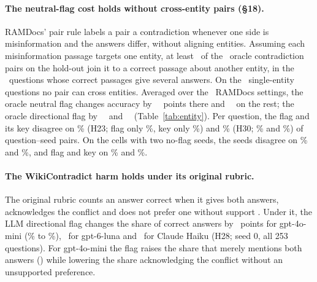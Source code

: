 \paragraph{The neutral-flag cost holds without cross-entity pairs (\S18).} RAMDocs' pair rule labels a pair a
contradiction whenever one side is misinformation and the answers differ, without aligning entities. Assuming each
misinformation passage targets one entity, at least \pairCrossLb\ of the \pairContraN\ oracle contradiction pairs on the
hold-out join it to a correct passage about another entity, in the \pairMultiN\ questions whose correct passages give
several answers. On the \pairSingleN\ single-entity questions no pair can cross entities. Averaged over the \entNeuK\
RAMDocs settings, the oracle neutral flag changes accuracy by \entNeuSingle\ \entNeuSingleCI\ points there and
\entNeuMulti\ \entNeuMultiCI\ on the rest; the oracle directional flag by \entDirSingle\ \entDirSingleCI\ and
\entDirMulti\ \entDirMultiCI\ (Table~\ref{tab:entity}). Per question, the flag and its key disagree on \agrTwentyThreeDis\% (H23; flag only \agrTwentyThreeFlagOnly\%,
key only \agrTwentyThreeKeyOnly\%) and \agrThirtyDis\% (H30; \agrThirtyFlagOnly\% and \agrThirtyKeyOnly\%) of
question--seed pairs. On the cells with two no-flag seeds, the seeds disagree on \agrTwentyThreeNull\% and \agrThirtyNull\%,
and flag and key on \agrTwentyThreeDisMatched\% and \agrThirtyDisMatched\%.

\paragraph{The WikiContradict harm holds under its original rubric.} The original rubric counts an answer correct when it gives
both answers, acknowledges the conflict and does not prefer one without support
\citep[\S3.4]{hou2024wikicontradict}. Under it, the LLM directional flag changes the share of correct answers
by \wikiOrigMiniEff\ points for gpt-4o-mini (\wikiOrigMiniPlain\% to \wikiOrigMiniDir\%), \wikiOrigLunaEff\ for
gpt-6-luna and \wikiOrigHaikuEff\ for Claude Haiku (H28; seed 0, all 253 questions). For gpt-4o-mini the flag raises the share that merely mentions both answers (\wikiBothMiniEff) while
lowering the share acknowledging the conflict without an unsupported preference.

